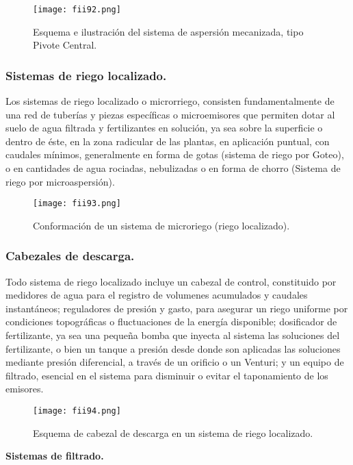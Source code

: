 \begin{figure}[h!]
	\centerline{\texttt{[image: fii92.png]}}
	\caption{Esquema e ilustración del sistema de aspersión mecanizada, tipo Pivote Central.}
	\label{fii92}
\end{figure}


\subsubsection{Sistemas de riego localizado.}
Los sistemas de riego localizado o microrriego, consisten fundamentalmente de una
red de tuberías y piezas específicas o microemisores que permiten dotar al suelo de
agua filtrada y fertilizantes en solución, ya sea sobre la superficie o dentro de éste, en la
zona radicular de las plantas, en aplicación puntual, con caudales mínimos,
generalmente en forma de gotas (sistema de riego por Goteo), o en cantidades de agua
rociadas, nebulizadas o en forma de chorro (Sistema de riego por microaspersión).

\begin{figure}[h!]
	\centerline{\texttt{[image: fii93.png]}}
	\caption{Conformación de un sistema de microriego (riego localizado).}
	\label{fii93}
\end{figure}

\subsubsection{Cabezales de descarga.}
Todo sistema de riego localizado incluye un cabezal de control, constituido por
medidores de agua para el registro de volumenes acumulados y caudales instantáneos;
reguladores de presión y gasto, para asegurar un riego uniforme por condiciones
topográficas o fluctuaciones de la energía disponible; dosificador de fertilizante, ya sea
una pequeña bomba que inyecta al sistema las soluciones del fertilizante, o bien un
tanque a presión desde donde son aplicadas las soluciones mediante presión
diferencial, a través de un orificio o un Venturi; y un equipo de filtrado, esencial en el
sistema para disminuir o evitar el taponamiento de los emisores.

\begin{figure}[h!]
	\centerline{\texttt{[image: fii94.png]}}
	\caption{ Esquema de cabezal de descarga en un sistema de riego localizado.}
	\label{fii94}
\end{figure}

\textbf{Sistemas de filtrado.}

